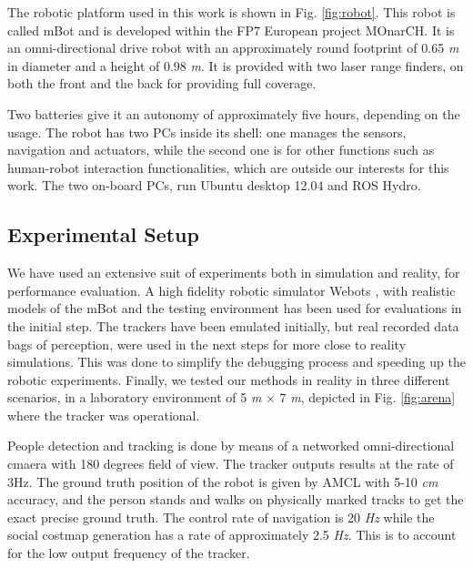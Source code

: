The robotic platform used in this work is shown in Fig. \ref{fig:robot}. This robot is called mBot \cite{Messias2014robotic} and is developed within the FP7 European project MOnarCH.
It is an omni-directional drive robot with an approximately round footprint of 0.65 \textit{m} in diameter and a height of 0.98 \textit{m}.
It is provided with two laser range finders, on both the front and the back for providing full coverage.

Two batteries give it an autonomy of approximately five hours, depending on the usage.
The robot has two PCs inside its shell: one manages the sensors, navigation and actuators, while the second one is for other functions such as human-robot interaction functionalities, which are outside our interests for this work. The two on-board PCs, run Ubuntu desktop 12.04 and ROS Hydro. 


\subsection{Experimental Setup}
\label{sec:Experimental_setup}


We have used an extensive suit of experiments both in simulation and reality, for performance evaluation. A high fidelity robotic simulator Webots \cite{michel1998webots}, with realistic models of the mBot and the testing environment has been used for evaluations in the initial step. The trackers have been emulated initially, but real recorded data bags of perception, were used in the next steps for more close to reality simulations. This was done to simplify the debugging process and speeding up the robotic experiments. %
Finally, we tested our methods in reality in three different scenarios, in a laboratory environment of 5 \textit{m} $\times$ 7 \textit{m}, depicted in Fig. \ref{fig:arena} where the tracker was operational.
 


People detection and tracking is done by means of a networked omni-directional cmaera with 180 degrees field of view. The tracker outputs results at the rate of 3Hz. The ground truth position of the robot is given by AMCL with 5-10 \textit{cm} accuracy, and the person stands and walks on physically marked tracks to get the exact precise ground truth.
The control rate of navigation is 20 \textit{Hz} while the social costmap generation has a rate of approximately 2.5 \textit{Hz}. This is to account for the low output frequency of the tracker.



